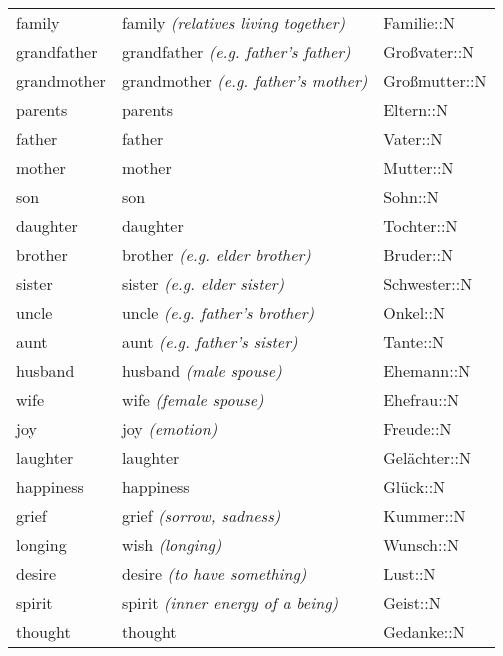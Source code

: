 \begin{center}
\begin{longtable}{lll}
{\sc \lowercase{	FAMILY	}}	&	family	\textit{\footnotesize (relatives living together)}	&	Familie::N	\\
{\sc \lowercase{	GRANDFATHER	}}	&	grandfather	\textit{\footnotesize (e.g. father's father)}	&	Großvater::N	\\
{\sc \lowercase{	GRANDMOTHER	}}	&	grandmother	\textit{\footnotesize (e.g. father's mother)}	&	Großmutter::N	\\
{\sc \lowercase{	PARENTS	}}	&	parents		&	Eltern::N	\\
{\sc \lowercase{	FATHER	}}	&	father		&	Vater::N	\\
{\sc \lowercase{	MOTHER	}}	&	mother		&	Mutter::N	\\
{\sc \lowercase{	SON	}}	&	son		&	Sohn::N	\\
{\sc \lowercase{	DAUGHTER	}}	&	daughter		&	Tochter::N	\\
{\sc \lowercase{	BROTHER	}}	&	brother	\textit{\footnotesize (e.g. elder brother)}	&	Bruder::N	\\
{\sc \lowercase{	SISTER	}}	&	sister	\textit{\footnotesize (e.g. elder sister)}	&	Schwester::N	\\
{\sc \lowercase{	UNCLE	}}	&	uncle	\textit{\footnotesize (e.g. father's brother)}	&	Onkel::N	\\
{\sc \lowercase{	AUNT	}}	&	aunt	\textit{\footnotesize (e.g. father's sister)}	&	Tante::N	\\
{\sc \lowercase{	HUSBAND	}}	&	husband	\textit{\footnotesize (male spouse)}	&	Ehemann::N	\\
{\sc \lowercase{	WIFE	}}	&	wife	\textit{\footnotesize (female spouse)}	&	Ehefrau::N	\\
{\sc \lowercase{	JOY	}}	&	joy	\textit{\footnotesize (emotion)}	&	Freude::N	\\
{\sc \lowercase{	LAUGHTER	}}	&	laughter		&	Gelächter::N	\\
{\sc \lowercase{	HAPPINESS	}}	&	happiness		&	Glück::N	\\
{\sc \lowercase{	GRIEF	}}	&	grief	\textit{\footnotesize (sorrow, sadness)}	&	Kummer::N	\\
{\sc \lowercase{	LONGING	}}	&	wish	\textit{\footnotesize (longing)}	&	Wunsch::N	\\
{\sc \lowercase{	DESIRE	}}	&	desire	\textit{\footnotesize (to have something)}	&	Lust::N	\\
{\sc \lowercase{	SPIRIT	}}	&	spirit	\textit{\footnotesize (inner energy of a being)}	&	Geist::N	\\
{\sc \lowercase{	THOUGHT	}}	&	thought		&	Gedanke::N	\\

\end{longtable}
\end{center}
